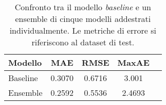 \begin{table}[tbp]
  \centering
  \begin{tabular}{lcccc}
    \toprule
    Modello         &  MAE   &  RMSE  & MaxAE \\
    \midrule
    Baseline        & 0.3070 & 0.6716 & 3.001 \\
    Ensemble        & 0.2592 & 0.5536 & 2.4693 \\
    \bottomrule
  \end{tabular}
  \caption{Confronto tra il modello \emph{baseline} e un ensemble di cinque
    modelli addestrati individualmente. Le metriche di errore si riferiscono
    al dataset di test.}%
  \label{tab:ensemble}%
\end{table}

